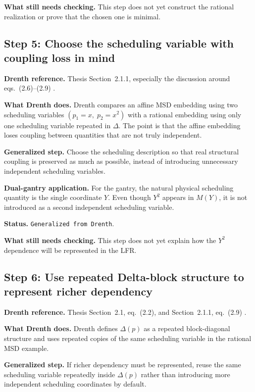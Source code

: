 ﻿\documentclass[11pt]{article}
\newcommand{\audititem}[2]{\par\smallskip\noindent\textbf{#1.} #2\par}
\newcommand{\statusline}[1]{\texttt{#1}}
\begin{document}
\audititem{What still needs checking}{This step does not yet construct the
rational realization or prove that the chosen one is minimal.}

\subsection{Step 5: Choose the scheduling variable with coupling loss in mind}

\audititem{Drenth reference}{Thesis Section~2.1.1, especially the discussion
around eqs.~(2.6)--(2.9) \cite{drenth2025thesis}.}

\audititem{What Drenth does}{Drenth compares an affine MSD embedding using two
scheduling variables $(p_1=x,\; p_2=x^2)$ with a rational embedding using only
one scheduling variable repeated in $\Delta$. The point is that the affine
embedding loses coupling between quantities that are not truly independent.}

\audititem{Generalized step}{Choose the scheduling description so that real
structural coupling is preserved as much as possible, instead of introducing
unnecessary independent scheduling variables.}

\audititem{Dual-gantry application}{For the gantry, the natural physical
scheduling quantity is the single coordinate $Y$. Even though $Y^2$ appears in
$M(Y)$, it is not introduced as a second independent scheduling variable.}

\audititem{Status}{\statusline{Generalized from Drenth}.}

\audititem{What still needs checking}{This step does not yet explain how the
$Y^2$ dependence will be represented in the LFR.}

\subsection{Step 6: Use repeated Delta-block structure to represent richer dependency}

\audititem{Drenth reference}{Thesis Section~2.1, eq.~(2.2), and Section~2.1.1,
eq.~(2.9) \cite{drenth2025thesis}.}

\audititem{What Drenth does}{Drenth defines $\Delta(p)$ as a repeated
block-diagonal structure and uses repeated copies of the same scheduling
variable in the rational MSD example.}

\audititem{Generalized step}{If richer dependency must be represented, reuse the
same scheduling variable repeatedly inside $\Delta(p)$ rather than introducing
more independent scheduling coordinates by default.}
\end{document}
